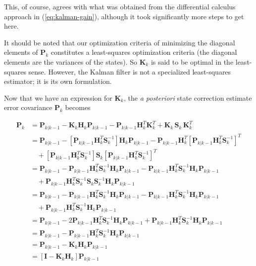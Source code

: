 This, of course, agrees with what was obtained from the differential calculus approach in
(\ref{eq:kalman-gain}), although it took significantly more steps to get here.

It should be noted that our optimization criteria of minimizing the diagonal elements of
$\mathbf{P}_k$ constitutes a least-squares optimization criteria (the diagonal elements
are the variances of the states). So $\mathbf{K}_k$ is said to be optimal in the
least-squares sense. However, the Kalman filter is not a specialized least-squares estimator;
it is its own formulation.

Now that we have an expression for $\mathbf{K}_k$, the \textit{a posteriori} state correction
estimate error covariance $\mathbf{P}_k$ becomes

\begin{equation*}
    \begin{aligned}
        \mathbf{P}_{k} &= \mathbf{P}_{k|k-1} - \mathbf{K}_k \mathbf{H}_k \mathbf{P}_{k|k-1} - \mathbf{P}_{k|k-1} \mathbf{H}_k^T \mathbf{K}_k^T
        + \mathbf{K}_k \, \mathbf{S}_k \, \mathbf{K}_k^T \\
        &= \mathbf{P}_{k|k-1}
        - \left[ \mathbf{P}_{k|k-1} \mathbf{H}_k^T \mathbf{S}_k^{-1} \right] \mathbf{H}_k \mathbf{P}_{k|k-1}
        - \mathbf{P}_{k|k-1} \mathbf{H}_k^T \left[ \mathbf{P}_{k|k-1} \mathbf{H}_k^T \mathbf{S}_k^{-1} \right]^T \\
        & \phantom{M} + \left[ \mathbf{P}_{k|k-1} \mathbf{H}_k^T \mathbf{S}_k^{-1} \right] \mathbf{S}_k \left[ \mathbf{P}_{k|k-1} \mathbf{H}_k^T \mathbf{S}_k^{-1} \right]^T \\
        &= \mathbf{P}_{k|k-1}
        - \mathbf{P}_{k|k-1} \mathbf{H}_k^T \mathbf{S}_k^{-1} \mathbf{H}_k \mathbf{P}_{k|k-1}
        - \mathbf{P}_{k|k-1} \mathbf{H}_k^T \mathbf{S}_k^{-1} \mathbf{H}_k \mathbf{P}_{k|k-1} \\
        & \phantom{M} + \mathbf{P}_{k|k-1} \mathbf{H}_k^T \mathbf{S}_k^{-1} \mathbf{S}_k \mathbf{S}_k^{-1} \mathbf{H}_k \mathbf{P}_{k|k-1} \\
        &= \mathbf{P}_{k|k-1}
        - \mathbf{P}_{k|k-1} \mathbf{H}_k^T \mathbf{S}_k^{-1} \mathbf{H}_k \mathbf{P}_{k|k-1}
        - \mathbf{P}_{k|k-1} \mathbf{H}_k^T \mathbf{S}_k^{-1} \mathbf{H}_k \mathbf{P}_{k|k-1} \\
        & \phantom{M} + \mathbf{P}_{k|k-1} \mathbf{H}_k^T \mathbf{S}_k^{-1} \mathbf{H}_k \mathbf{P}_{k|k-1} \\
        &= \mathbf{P}_{k|k-1}
        - 2 \mathbf{P}_{k|k-1} \mathbf{H}_k^T \mathbf{S}_k^{-1} \mathbf{H}_k \mathbf{P}_{k|k-1}
        + \mathbf{P}_{k|k-1} \mathbf{H}_k^T \mathbf{S}_k^{-1} \mathbf{H}_k \mathbf{P}_{k|k-1} \\
        &= \mathbf{P}_{k|k-1}
        - \mathbf{P}_{k|k-1} \mathbf{H}_k^T \mathbf{S}_k^{-1} \mathbf{H}_k \mathbf{P}_{k|k-1} \\
        &= \mathbf{P}_{k|k-1} - \mathbf{K}_k \mathbf{H}_k \mathbf{P}_{k|k-1} \\
        &= \left[ \mathbf{I} - \mathbf{K}_k \mathbf{H}_k \right] \mathbf{P}_{k|k-1}
    \end{aligned}
\end{equation*}

